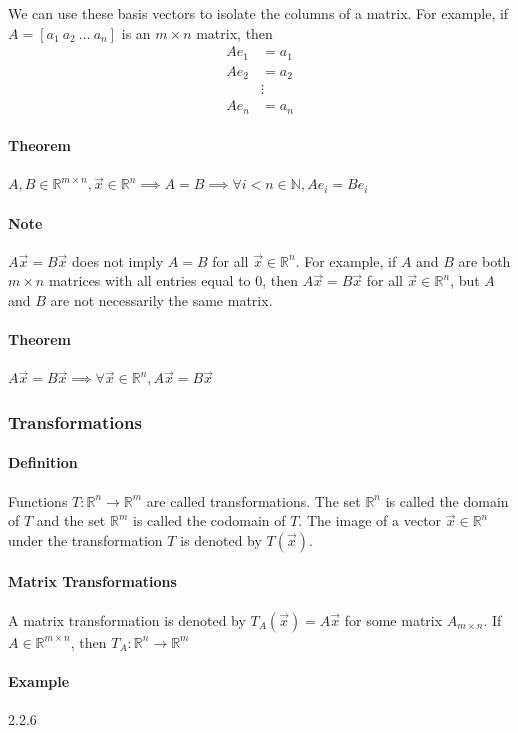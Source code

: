 We can use these basis vectors to isolate the columns of a matrix. For example, if $A = [a_1 \ a_2 \ \ldots \ a_n]$ is an $m \times n$ matrix, then
\begin{align*}
Ae_1 &= a_1 \\
Ae_2 &= a_2 \\
&\vdots \\
Ae_n &= a_n
\end{align*} 

\paragraph*{Theorem}
$A, B \in \mathbb{R}^{m \times n}, \vec{x} \in \mathbb{R}^n \implies A=B \implies \forall i < n \in \mathbb{N}, Ae_i = Be_i$

\paragraph*{Note}
$A\vec{x} = B\vec{x}$ does not imply $A = B$ for all $\vec{x} \in \mathbb{R}^n$. For example, if $A$ and $B$ are both $m \times n$ matrices with all entries equal to 0, then $A\vec{x} = B\vec{x}$ for all $\vec{x} \in \mathbb{R}^n$, but $A$ and $B$ are not necessarily the same matrix.

\paragraph*{Theorem}
$A\vec{x} = B\vec{x} \implies \forall \vec{x} \in \mathbb{R}^n, A\vec{x} = B\vec{x}$

\hrulefill

\subsubsection*{Transformations}
\paragraph*{Definition}
Functions $T : \mathbb{R}^n \to \mathbb{R}^m$ are called transformations. 
The set $\mathbb{R}^n$ is called the domain of $T$ and the set $\mathbb{R}^m$ is called the codomain of $T$. 
The image of a vector $\vec{x} \in \mathbb{R}^n$ under the transformation $T$ is denoted by $T(\vec{x})$. 

\paragraph*{Matrix Transformations}
A matrix transformation is denoted by $T_A(\vec{x}) = A\vec{x}$ for some matrix $A_{m \times n}$. If $A \in \mathbb{R}^{m \times n}$, then $T_A : \mathbb{R}^n \to \mathbb{R}^m$

\paragraph*{Example} 2.2.6

